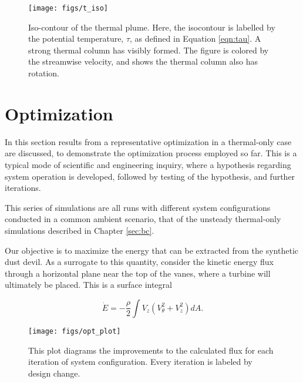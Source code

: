 %
%
  \begin{figure}[!htb]
   \begin{center}
    \texttt{[image: figs/t\_iso]}
    \caption{Iso-contour of the thermal plume. Here, the isocontour is
    labelled by the potential temperature, $\tau$, as defined in
    Equation \ref{eqn:tau}. A strong thermal column has visibly formed. The
    figure is colored by the streamwise velocity, and shows the thermal
    column also has rotation.} 
    \label{fig:field_real}
   \end{center}
  \end{figure}

\section{Optimization}

In this section results from a representative optimization
in a thermal-only case are discussed, to demonstrate the optimization 
process employed so far. This is a typical mode of scientific and
engineering inquiry, where a hypothesis regarding system operation is
developed, followed by testing of the hypothesis, and further
iterations.  

This series of simulations are all runs with different system
configurations conducted in a common ambient scenario, that of the
unsteady thermal-only simulations described in Chapter \ref{sec:bc}. 

Our objective is to maximize the energy that can be 
extracted from the synthetic dust devil. As a surrogate to this
quantity, consider the kinetic energy flux through a horizontal plane
near the top of the vanes, where a turbine will ultimately be
placed. This is a surface integral\cite{landau1959fm}


 \begin{equation}
 \dot E = -\frac{\rho }{2} \int V_z (V_{\theta}^2 + V_z^2 ) dA.
 \end{equation}

\begin{figure}[htb]
 \centering
 \texttt{[image: figs/opt\_plot]}
 \caption{This plot diagrams the improvements to the calculated flux for  
 each iteration of system configuration. Every iteration is labeled by
 design change.}
 \label{fig:opt_plot}
\end{figure}


